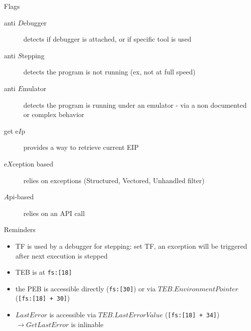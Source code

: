 \sig

\newpage

{\large Flags}
\begin{description}
\item[anti $D$ebugger]
detects if debugger is attached, or if specific tool is used
\item[anti $S$tepping]
detects the program is not running (ex, not at full speed)
\item[anti $E$mulator]
detects the program is running under an emulator - via a non documented or complex behavior
\item[get e$I$p]
provides a way to retrieve current EIP
\item[e$X$ception based]
relies on exceptions (Structured, Vectored, Unhandled filter)
\item[$A$pi-based]
relies on an API call
\end{description}


{\large Reminders}
\begin{itemize}
\item
TF is used by a debugger for stepping: set TF, an exception will be triggered after next execution is stepped
\item
TEB is at {\tt fs:[18]}
\item
the PEB is accessible directly ({\tt fs:[30]}) or via $TEB.EnvironmentPointer$ ({\tt [fs:[18] + 30]})
\item
$LastError$ is accessible via $TEB.LastErrorValue$ ({\tt [fs:[18] + 34]}) $\rightarrow GetLastError$ is inlinable
\end{itemize}
\sig

